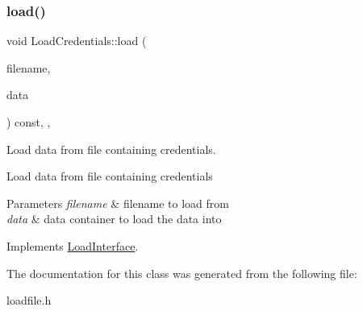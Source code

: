 \subsubsection{\texorpdfstring{load()}{load()}}
{\footnotesize\ttfamily void Load\+Credentials\+::load (\begin{DoxyParamCaption}\item[{std\+::string}]{filename,  }\item[{\mbox{\hyperlink{classFileDataContainer}{File\+Data\+Container}} $\ast$}]{data }\end{DoxyParamCaption}) const\hspace{0.3cm}{\ttfamily [inline]}, {\ttfamily [override]}, {\ttfamily [virtual]}}



Load data from file containing credentials. 

Load data from file containing credentials 
\begin{DoxyParams}{Parameters}
{\em filename} & filename to load from \\
\hline
{\em data} & data container to load the data into \\
\hline
\end{DoxyParams}


Implements \mbox{\hyperlink{classLoadInterface_a91bdc01550e64219c4007afce054fd40}{Load\+Interface}}.



The documentation for this class was generated from the following file\+:\begin{DoxyCompactItemize}
\item 
loadfile.\+h\end{DoxyCompactItemize}
